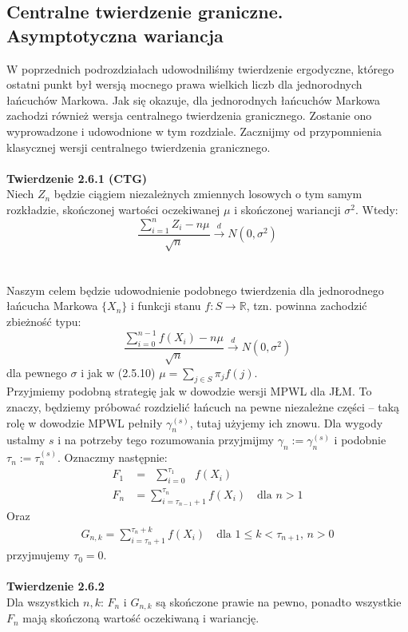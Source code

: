 \documentclass[a4paper]{article}
\begin{document}
\subsection{Centralne twierdzenie graniczne. Asymptotyczna wariancja}
W poprzednich podrozdziałach udowodniliśmy twierdzenie ergodyczne, którego ostatni punkt był wersją mocnego prawa wielkich liczb dla jednorodnych łańcuchów Markowa. Jak się okazuje, dla jednorodnych łańcuchów Markowa zachodzi również wersja centralnego twierdzenia granicznego. Zostanie ono wyprowadzone i udowodnione w tym rozdziale. Zacznijmy od przypomnienia klasycznej wersji centralnego twierdzenia granicznego.\\
\\
\textbf{Twierdzenie 2.6.1 (CTG)}\\
Niech $Z_n$ będzie ciągiem niezależnych zmiennych losowych o tym samym rozkładzie, skończonej wartości oczekiwanej $\mu$ i skończonej wariancji $\sigma^2$. Wtedy:
$$\frac{\sum\limits_{i=1}^n Z_i - n\mu}{\sqrt{n}} \overset{d}{\to} N(0, \sigma^2)$$
\\
\\
Naszym celem będzie udowodnienie podobnego twierdzenia dla jednorodnego łańcucha Markowa $\{X_n\}$ i funkcji stanu $f: S \to \mathbb{R}$, tzn. powinna zachodzić zbieżność typu:
$$ \frac{\sum\limits_{i=0}^{n-1} f(X_i) - n\mu}{\sqrt{n}} \overset{d}{\to} N(0, \sigma^2)$$
dla pewnego $\sigma$ i jak w (2.5.10) $\mu = \sum\limits_{j \in S} \pi_j f(j)$. \\
Przyjmiemy podobną strategię jak w dowodzie wersji MPWL dla JŁM. To znaczy, będziemy próbować rozdzielić łańcuch na pewne niezależne części – taką rolę w dowodzie MPWL pełniły $\gamma_n^{(s)}$, tutaj użyjemy ich znowu. Dla wygody ustalmy $s$ i na potrzeby tego rozumowania przyjmijmy $\gamma_n := \gamma_n^{(s)}$ i podobnie $\tau_n := \tau_n^{(s)}$.
Oznaczmy następnie:
\begin{align*}
    F_1 &= \,\,\,\sum\limits_{i = 0}^{\tau_1} \,\,\,\,f(X_i)\\
    F_n &= \sum\limits_{i = \tau_{n-1}+1}^{\tau_n} f(X_i) \quad \text{dla $n > 1$}
\end{align*}
Oraz
\begin{align*}
    G_{n, k} = \sum\limits_{i = \tau_n+1}^{\tau_n+k} f(X_i) \quad \text{dla $1 \leq k < \tau_{n+1}$, $n > 0$}
\end{align*}
przyjmujemy $\tau_0 = 0$.\\\\
\textbf{Twierdzenie 2.6.2}\\
Dla wszystkich $n,k$: $F_n$ i $G_{n,k}$ są skończone prawie na pewno, ponadto wszystkie $F_n$ mają skończoną wartość oczekiwaną i wariancję.\\
\end{document}
